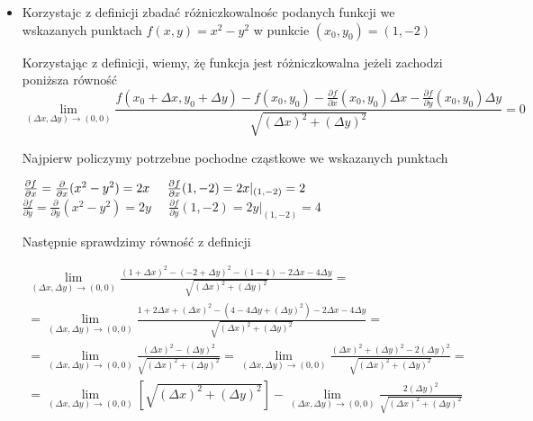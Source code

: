 \documentclass[12pt]{article}
\begin{document}
\begin{itemize}
        \item Korzystajc z definicji zbadać różniczkowalnośc podanych funkcji we wskazanych punktach \newline
        $f(x,y) = x^2 - y^2$
        w punkcie $(x_0, y_0) = (1, -2)$
        
        Korzystając z definicji, wiemy, żę funkcja jest różniczkowalna jeżeli zachodzi poniższa równość
        \begin{equation}
            \lim_{(\Delta x, \Delta y) \rightarrow (0,0)} \frac{f(x_0 + \Delta x, y_0 + \Delta y) - f(x_0, y_0) - \frac{\partial f}{\partial x} (x_0, y_0) \Delta x - \frac{\partial f}{\partial y} (x_0, y_0) \Delta y}{\sqrt{(\Delta x)^2 + (\Delta y)^2}} = 0
        \end{equation}
        
        Najpierw policzymy potrzebne pochodne cząstkowe we wskazanych punktach\newline
        
        $\frac{\partial f}{\partial x} = \frac{\partial }{\partial x} (x^2 - y^2) = 2x \; \; \; \; \; \frac{\partial f}{\partial x} (1,-2) = 2x | _{(1,-2)} = 2 \\$ \newline
        $\frac{\partial f}{\partial y} = \frac{\partial}{\partial y} (x^2 - y^2) = 2y \; \; \; \; \; \frac{\partial f}{\partial y} (1, -2) = 2y | _{(1,-2)} = 4$
        
         Następnie sprawdzimy równość z definicji
         
         \begin{equation}
         \begin{aligned}
            \lim_{(\Delta x, \Delta y) \rightarrow (0,0)} \frac{(1 + \Delta x)^2 - (-2 + \Delta y)^2 - (1 - 4) - 2 \Delta x - 4 \Delta y }{\sqrt{(\Delta x)^2 + (\Delta y)^2}} = \\
            = \lim_{(\Delta x, \Delta y) \rightarrow (0,0)} \frac{1 + 2 \Delta x + (\Delta x)^2 - (4 - 4 \Delta y + (\Delta y)^2) - 2 \Delta x - 4 \Delta y}{ \sqrt{(\Delta x)^2 + (\Delta y)^2}} = \\
            = \lim_{(\Delta x, \Delta y) \rightarrow (0,0)} \frac{(\Delta x)^2 - (\Delta y)^2}{\sqrt{(\Delta x)^2 + (\Delta y)^2}} = \lim_{(\Delta x, \Delta y) \rightarrow (0,0)} \frac{(\Delta x)^2 + (\Delta y)^2 - 2(\Delta y)^2}{\sqrt{(\Delta x)^2 + (\Delta y)^2}} = \\
            = \lim_{(\Delta x, \Delta y) \rightarrow (0,0)} \left[ \sqrt{(\Delta x)^2 + (\Delta y)^2} \right] - \lim_{(\Delta x, \Delta y) \rightarrow (0,0)} \frac{2(\Delta y)^2}{\sqrt{(\Delta x)^2 + (\Delta y)^2}} \\
            \end{aligned}
        \end{equation}
        

\end{itemize}
\end{document}
